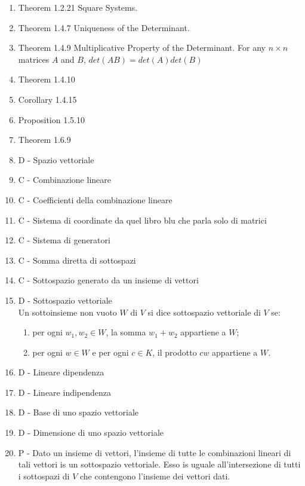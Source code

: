 \documentclass[]{article}
\begin{document}
\begin{enumerate}
\item Theorem 1.2.21 Square Systems.

\item Theorem 1.4.7 Uniqueness of the Determinant.

\item Theorem 1.4.9 Multiplicative Property of the Determinant. For any $n \times n$ matrices $A$ and $B$, $det(AB)=det(A)det(B)$

\item Theorem 1.4.10 

\item Corollary 1.4.15

\item Proposition 1.5.10

\item Theorem 1.6.9			  
			  
	\item D - Spazio vettoriale
	\item C - Combinazione lineare
	\item C - Coefficienti della combinazione lineare
	\item C - Sistema di coordinate da quel libro blu che parla solo di matrici
	\item C - Sistema di generatori
	\item C - Somma diretta di sottospazi
	\item C - Sottospazio generato da un insieme di vettori
	\item D - Sottospazio vettoriale \\
			  Un sottoinsieme non vuoto $W$ di $V$ si dice sottospazio vettoriale di $V$ se:
			  \begin{enumerate}
			  	\item per ogni $w_1, w_2 \in W$, la somma $w_1+w_2$ appartiene a $W$;
			  	\item per ogni $w \in W$ e per ogni $c \in K$, il prodotto $cw$ appartiene a $W$.
			  \end{enumerate}	
	\item D - Lineare dipendenza
	\item D - Lineare indipendenza
	\item D - Base di uno spazio vettoriale 
	\item D - Dimensione di uno spazio vettoriale
	\item P - Dato un insieme di vettori, l'insieme di tutte le combinazioni lineari di tali vettori is un sottospazio vettoriale. Esso is uguale all'intersezione di tutti i sottospazi di $V$ che contengono l'insieme dei vettori dati.


\end{enumerate}
\end{document}
